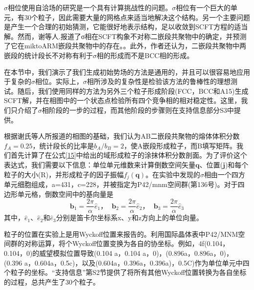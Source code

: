 \documentclass[12pt，a4paper]{article}
\numberwithin{equation}{section}
\begin{document}
$\sigma$相位使用自洽场的研究是一个具有计算挑战性的问题。$\sigma$相位有一个巨大的单元，有30个粒子，因此需要大量的网格点来适当地解决这个结构。另一个主要问题是产生一个合理的初始猜测，它能很好地表示结构，足以收敛到SCFT方程的适当解。然而，谢等人.报道了σ相在SCFT构象不对称二嵌段共聚物中的确定，并预测了它在miktoARM嵌段共聚物中的存在。。此外，作者还认为，二嵌段共聚物中两嵌段的统计段长不对称有利于$\sigma$相的形成而不是BCC相的形成。


在本节中，我们演示了我们生成初始势场的方法是通用的，并且可以很容易地应用于复杂的$\sigma$相位。实际上，$\sigma$相所涉及的复杂性是检验该方法的鲁棒性的理想测试。随后，我们使用同样的方法为另外三个粒子形成阶段(FCC，BCC和A15)生成SCFT解，并在相图中的一个状态点检验所有四个竞争相的相对稳定性。这里，我们只介绍了$\sigma$相阶段的一步的过程，而其他阶段的步骤则在支持信息部分S3中提供。

根据谢氏等人所报道的相图的基础，我们认为AB二嵌段共聚物的熔体体积分数$f_A=0.25$，统计段长的比率是$b_A/b_B=2$，使A嵌段形成粒子，而B填写矩阵。我们首先计算了在公式\ref{15}中给出的域形成粒子的涂抹体积分数剖面。为了评价这个表达式，我们需要以下信息：单位单元维数来计算倒数空间矢量$\mathbf{q}$、位置($\mathbf{j}$)和每个粒子的大小(R)，并形成粒子的因子振幅$f_j(\mathbf{q})$。在实验中发现的$\sigma$相由一个四方单元细胞组成，a=431，c=228，并被指定为P42/mnm空间群(第136号)。对于四边形单元格，倒数空间中的基向量是
\begin{equation}\label{17}
\mathbf{b}_1=\frac{2\pi}{\alpha}\hat{e}_1，~~~\mathbf{b}_2=\frac{2\pi}{\alpha}\hat{e}_2，~~~\mathbf{b}_3=\frac{2\pi}{\alpha}\hat{e}_3
\end{equation}
其中，$\hat{e}_1$、$\hat{e}_2$和$\hat{e}_3$分别是笛卡尔坐标系x、y和z方向上的单位向量。

粒子的位置在实验上是用Wyckoff位置来报告的。利用国际晶体表中P42/MNM空间群的对称运算，将个Wyckoff位置变换为各自的协坐标。例如，4f(0.104，0.104，0)的威望模拟位置导致(0.104 a，0.104 a，0)，(0.896a，0.896a，0)，(0.396 a，0.604a，0.5c)，以及(0.604a，0.396a，0.396a)，0.5C)作为单位单元中四个粒子的坐标。“支持信息”第S2节提供了将所有其他Wyckoff位置转换为各自坐标的过程，总共产生了30个粒子。
\end{document}
